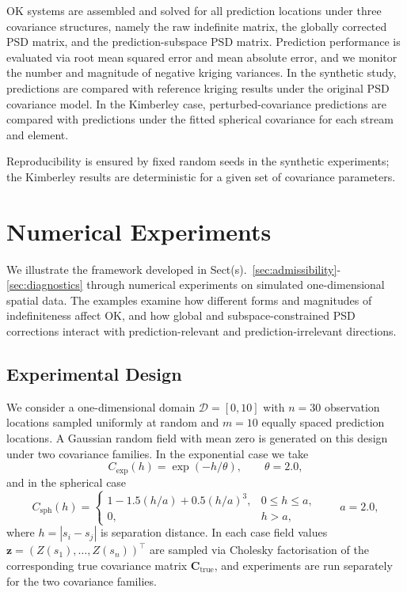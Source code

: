\documentclass[smallextended]{svjour3}
\newcommand{\1}{\mathbf{1}}
\begin{document}
OK systems are assembled and solved for all prediction locations under three covariance structures, namely the raw indefinite matrix, the globally corrected PSD matrix, and the prediction-subspace PSD matrix. Prediction performance is evaluated via root mean squared error and mean absolute error, and we monitor the number and magnitude of negative kriging variances. In the synthetic study, predictions are compared with reference kriging results under the original PSD covariance model. In the Kimberley case, perturbed-covariance predictions are compared with predictions under the fitted spherical covariance for each stream and element.

Reproducibility is ensured by fixed random seeds in the synthetic experiments; the Kimberley results are deterministic for a given set of covariance parameters.
		
\section{Numerical Experiments}
\label{sec:numerical}

We illustrate the framework developed in Sect(s).~\ref{sec:admissibility}-\ref{sec:diagnostics} through numerical experiments on simulated one-dimensional spatial data. The examples examine how different forms and magnitudes of indefiniteness affect OK, and how global and subspace-constrained PSD corrections interact with prediction-relevant and prediction-irrelevant directions.

\subsection{Experimental Design}

We consider a one-dimensional domain $\mathcal{D} = [0,10]$ with $n = 30$ observation locations sampled uniformly at random and $m = 10$ equally spaced prediction locations. A Gaussian random field with mean zero is generated on this design under two covariance families. In the exponential case we take
\[
C_{\exp}(h) = \exp(-h/\theta), \qquad \theta = 2.0,
\]
and in the spherical case
\[
C_{\mathrm{sph}}(h) =
\begin{cases}
	1 - 1.5(h/a) + 0.5(h/a)^3, & 0 \le h \le a,\\[4pt]
	0, & h > a,
\end{cases}
\qquad a = 2.0,
\]
where $h = |s_i - s_j|$ is separation distance. In each case field values $\mathbf{z} = (Z(s_1),\ldots,Z(s_n))^\top$ are sampled via Cholesky factorisation of the corresponding true covariance matrix $\mathbf{C}_{\mathrm{true}}$, and experiments are run separately for the two covariance families.
\end{document}
